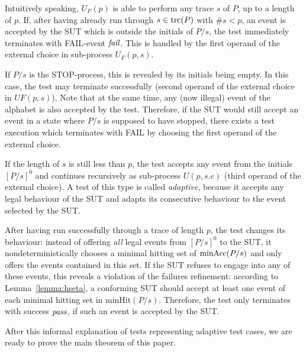 Intuitively speaking, $U_F(p)$ is able to perform any trace $s$ of $P$, 
up to a length of $p$. 
If, after having already run through $s\in\text{trc}(P)$ with $\#s < p$,
an event is accepted by the SUT which is outside the initials of $P/s$, the test 
immediately terminates with FAIL-event ${\text{\it fail}}$. This is handled by the first operand of the
external choice in sub-process $U_F(p,s)$.

If $P/s$ is the STOP-process, this is revealed by its initials being empty. In this case, the test may terminate 
successfully (second operand of the external choice in $UF(p,s)$). Note that at the same time, any (now illegal) event of the alphabet is also accepted by the test.
Therefore,
if the SUT would still accept an event in a state where $P/s$ is supposed to have stopped, there exists a test execution which terminates with FAIL by choosing the first
operand of the external choice.

If the length of $s$ is still less than $p$, the test accepts any event from the initials
$[P/s]^0$ and continues recursively as sub-process $U(p,s.e)$ (third operand of the external choice). A test of this type is called \emph{adaptive}, because it accepts any legal behaviour of the SUT and adapts its consecutive behaviour to the event selected by the SUT.
 
After having  run successfully 
through a trace of length $p$, the test changes its behaviour:
instead of offering {\it all} legal events from $[P/s]^0$ to the SUT, 
it nondeterministically chooses 
a minimal hitting set of $\text{minAcc}(P/s)$ and only offers the events contained in this set.
If the SUT refuses to engage into any of these events, this reveals a violation of the
failures refinement: according to Lemma~\ref{lemma:hseta}, a conforming SUT should accept
at least one event of each minimal hitting set in $\text{minHit}(P/s)$. Therefore, the test
only terminates with success ${\text{\it pass}}$, if such an event is accepted by the SUT.

After this informal explanation of tests representing adaptive test cases, we are ready to prove the main theorem of this paper.

